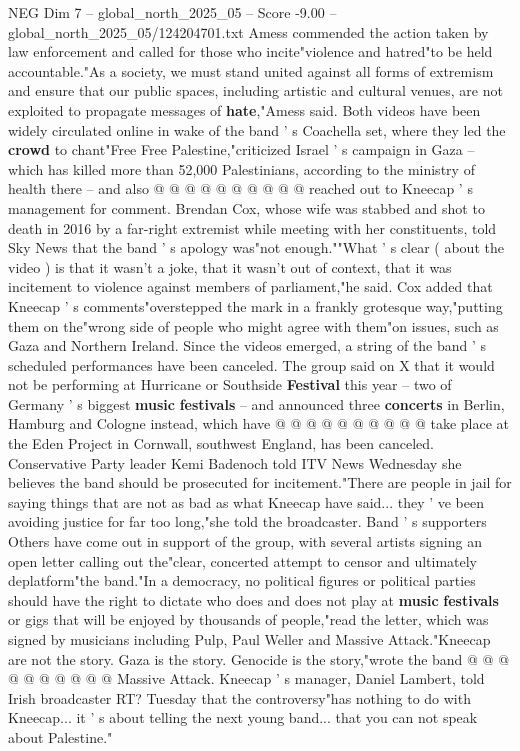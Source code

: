 \begin{textsample}{NEG Dim 7 – global\_north\_2025\_05 – Score -9.00 – global\_north\_2025\_05/124204701.txt}
Amess commended the action taken by law enforcement and called for those who incite"violence and hatred"to be held accountable."As a society, we must stand united against all forms of extremism and ensure that our public spaces, including artistic and cultural venues, are not exploited to propagate messages of \textbf{hate},"Amess said.
Both videos have been widely circulated online in wake of the band ' s Coachella set, where they led the \textbf{crowd} to chant"Free Free Palestine,"criticized Israel ' s campaign in Gaza -- which has killed more than 52,000 Palestinians, according to the ministry of health there -- and also @ @ @ @ @ @ @ @ @ @ reached out to Kneecap ' s management for comment.
Brendan Cox, whose wife was stabbed and shot to death in 2016 by a far-right extremist while meeting with her constituents, told Sky News that the band ' s apology was"not enough.""What ' s clear ( about the video ) is that it wasn't a joke, that it wasn't out of context, that it was incitement to violence against members of parliament,"he said.
Cox added that Kneecap ' s comments"overstepped the mark in a frankly grotesque way,"putting them on the"wrong side of people who might agree with them"on issues, such as Gaza and Northern Ireland.
Since the videos emerged, a string of the band ' s scheduled performances have been canceled.
The group said on X that it would not be performing at Hurricane or Southside \textbf{Festival} this year -- two of Germany ' s biggest \textbf{music} \textbf{festivals} -- and announced three \textbf{concerts} in Berlin, Hamburg and Cologne instead, which have @ @ @ @ @ @ @ @ @ @ take place at the Eden Project in Cornwall, southwest England, has been canceled.
Conservative Party leader Kemi Badenoch told ITV News Wednesday she believes the band should be prosecuted for incitement."There are people in jail for saying things that are not as bad as what Kneecap have said... they ' ve been avoiding justice for far too long,"she told the broadcaster.
Band ' s supporters Others have come out in support of the group, with several artists signing an open letter calling out the"clear, concerted attempt to censor and ultimately deplatform"the band."In a democracy, no political figures or political parties should have the right to dictate who does and does not play at \textbf{music} \textbf{festivals} or gigs that will be enjoyed by thousands of people,"read the letter, which was signed by musicians including Pulp, Paul Weller and Massive Attack."Kneecap are not the story.
Gaza is the story.
Genocide is the story,"wrote the band @ @ @ @ @ @ @ @ @ @ Massive Attack.
Kneecap ' s manager, Daniel Lambert, told Irish broadcaster RT?
Tuesday that the controversy"has nothing to do with Kneecap... it ' s about telling the next young band... that you can not speak about Palestine."

\end{textsample}
